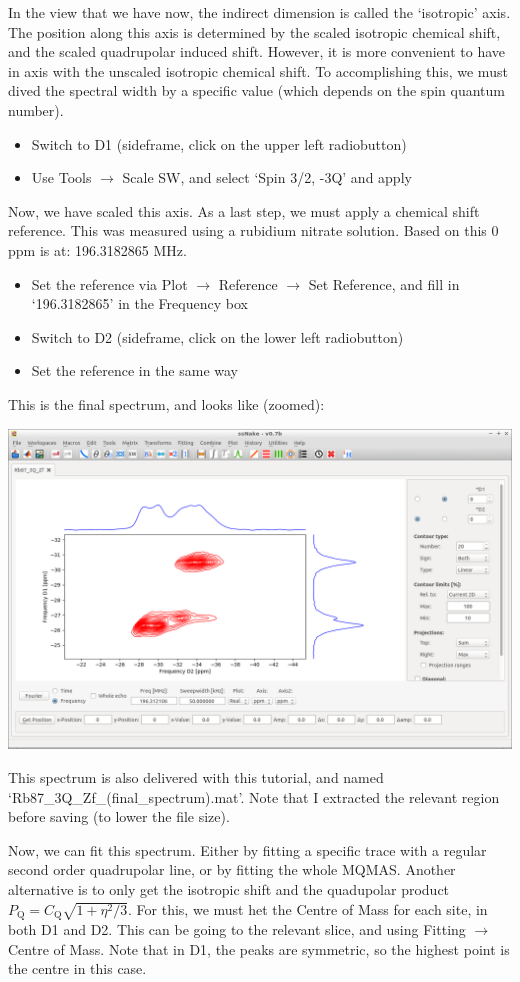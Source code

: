 \documentclass[11pt,a4paper]{article}
\begin{document}
In the view that we have now, the indirect dimension is called the `isotropic' axis. The position
along this axis is determined by the scaled isotropic chemical shift, and the scaled quadrupolar
induced shift. However, it is more convenient to have in axis with the unscaled isotropic chemical
shift. To accomplishing this, we must dived the spectral width by a specific value (which depends on
the spin quantum number).
\begin{itemize}
	\item Switch to D1 (sideframe, click on the upper left radiobutton)
	\item Use Tools  $\longrightarrow$ Scale SW, and select `Spin 3/2, -3Q' and apply
\end{itemize}
Now, we have scaled this axis. As a last step, we must apply a chemical shift reference. This was
measured using a rubidium nitrate solution. Based on this 0 ppm is at: 196.3182865 MHz.
\begin{itemize}
  \item Set the reference via Plot $\longrightarrow$ Reference $\longrightarrow$ Set Reference, and
	 fill in `196.3182865' in the Frequency box
	\item Switch to D2 (sideframe, click on the lower left radiobutton)
	\item Set the reference in the same way
\end{itemize}
This is the final spectrum, and looks like (zoomed):
\begin{center}
\includegraphics[width=0.8\linewidth]{Figs/Fig8.png}
\end{center}
This spectrum is also delivered with this tutorial, and named `Rb87\_3Q\_Zf\_(final\_spectrum).mat'.
Note that I extracted the relevant region before saving (to lower the file size).
 
Now, we can fit this spectrum. Either by fitting a specific trace with a regular second order
quadrupolar line, or by fitting the whole MQMAS. Another alternative is to only get the isotropic
shift and the quadupolar product $P_\text{Q} = C_\text{Q}\sqrt{1+\eta^2/3}$. For this, we must het
the Centre of Mass for each site, in both D1 and D2. This can be going to the relevant slice,
and using Fitting  $\longrightarrow$ Centre of Mass. Note that in D1, the peaks are symmetric, so the highest
point is the centre in this case.
\end{document}
